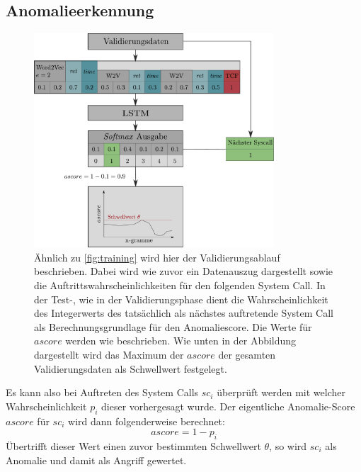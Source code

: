         \subsection{Anomalieerkennung}\label{sec:Anomalieerkennung}
            \begin{figure}[ht]
                \centering
                \includegraphics[width=0.8\textwidth]{images/Validation_overview.pdf}
                \caption{Ähnlich zu \autoref{fig:training} wird hier der Validierungsablauf beschrieben.
                         Dabei wird wie zuvor ein Datenauszug dargestellt sowie die Auftrittswahrscheinlichkeiten für den folgenden System Call.
                         In der Test-, wie in der Validierungsphase dient die Wahrscheinlichkeit des Integerwerts des tatsächlich als nächstes auftretende System Call als Berechnungsgrundlage für den Anomaliescore.
                     Die Werte für $ascore$ werden wie beschrieben. Wie unten in der Abbildung dargestellt wird das Maximum der $ascore$ der gesamten Validierungsdaten als Schwellwert festgelegt.}
                \label{fig:validierung}
            \end{figure}
            Es kann also bei Auftreten des System Calls $sc_i$ überprüft werden mit welcher Wahrscheinlichkeit $p_i$ dieser vorhergesagt wurde.
            Der eigentliche Anomalie-Score $ascore$ für $sc_i$ wird dann folgenderweise berechnet:
            \begin{equation}
                ascore = 1 - p_i
            \end{equation}
            Übertrifft dieser Wert einen zuvor bestimmten Schwellwert $\theta$, so wird $sc_i$ als Anomalie und damit als Angriff gewertet.

